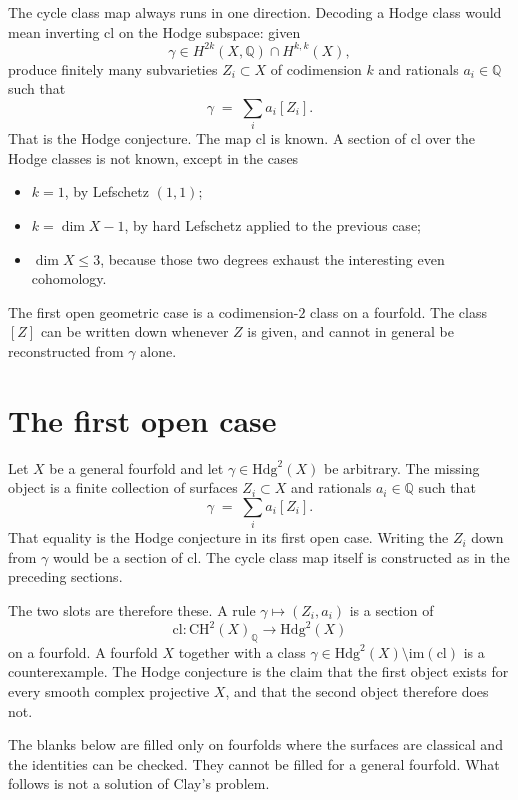 \documentclass[11pt,a4paper]{article}
\newcommand{\Q}{\mathbb{Q}}
\theoremstyle{definition}
\theoremstyle{remark}
\begin{document}
The cycle class map always runs in one direction. Decoding a Hodge class
would mean inverting \(\mathrm{cl}\) on the Hodge subspace: given
\[
\gamma\in H^{2k}(X,\Q)\cap H^{k,k}(X),
\]
produce finitely many subvarieties \(Z_i\subset X\) of codimension \(k\)
and rationals \(a_i\in\Q\) such that
\[
\gamma\;=\;\sum_i a_i[Z_i].
\]
That is the Hodge conjecture. The map \(\mathrm{cl}\) is known. A
section of \(\mathrm{cl}\) over the Hodge classes is not known, except
in the cases
\begin{itemize}[leftmargin=1.6em]
\item \(k=1\), by Lefschetz \((1,1)\);
\item \(k=\dim X-1\), by hard Lefschetz applied to the previous case;
\item \(\dim X\le 3\), because those two degrees exhaust the interesting
even cohomology.
\end{itemize}
The first open geometric case is a codimension-\(2\) class on a
fourfold. The class \([Z]\) can be written down whenever \(Z\) is given,
and cannot in general be reconstructed from \(\gamma\) alone.

\section{The first open case}

Let \(X\) be a general fourfold and let \(\gamma\in\mathrm{Hdg}^2(X)\)
be arbitrary. The missing object is a finite collection of surfaces
\(Z_i\subset X\) and rationals \(a_i\in\Q\) such that
\[
\gamma\;=\;\sum_i a_i[Z_i].
\]
That equality is the Hodge conjecture in its first open case. Writing
the \(Z_i\) down from \(\gamma\) would be a section of \(\mathrm{cl}\).
The cycle class map itself is constructed as in the preceding sections.

The two slots are therefore these. A rule \(\gamma\mapsto(Z_i,a_i)\) is
a section of
\[
\mathrm{cl}\colon\mathrm{CH}^2(X)_{\Q}\longrightarrow\mathrm{Hdg}^2(X)
\]
on a fourfold. A fourfold \(X\) together with a class
\(\gamma\in\mathrm{Hdg}^2(X)\setminus\mathrm{im}(\mathrm{cl})\) is a
counterexample. The Hodge conjecture is the claim that the first object
exists for every smooth complex projective \(X\), and that the second
object therefore does not.

The blanks below are filled only on fourfolds where the surfaces are
classical and the identities can be checked. They cannot be filled for
a general fourfold. What follows is not a solution of Clay's problem.
\end{document}

